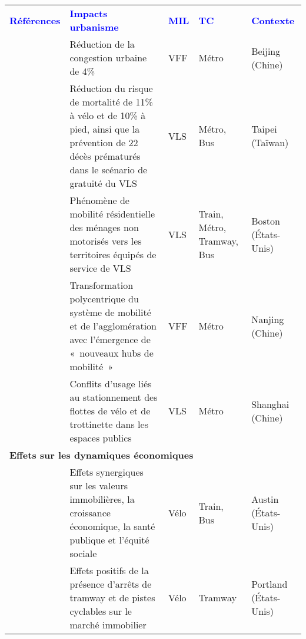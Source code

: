         \begin{longtable}{p{3cm}p{4cm}p{1.5cm}p{1.8cm}p{2.3cm}}
        \hline
        \textcolor{blue}{\textbf{Références}} & \textcolor{blue}{\textbf{Impacts urbanisme}} & \textcolor{blue}{\textbf{MIL}} & \textcolor{blue}{\textbf{TC}} & \textcolor{blue}{\textbf{Contexte}}
        \hline
        \endhead
\multicolumn{5}{l}{\textbf{Effets sur les territoires}}\\
    \small{\textcite{fan_dockless_2020}}\index{Fan, Yichun|pagebf} & \small{Réduction de la congestion urbaine de 4\%} & \small{VFF} & \small{Métro} & \small{Beijing (Chine)}\\
    \small{\textcite{lu_improving_2018}}\index{Lu, Miaojia|pagebf} & \small{Réduction du risque de mortalité de 11\% à vélo et de 10\% à pied, ainsi que la prévention de 22 décès prématurés dans le scénario de gratuité du VLS} & \small{VLS} & \small{Métro, Bus} & \small{Taipei (Taïwan)}\\
    \small{\textcite{basu_planning_2021}}\index{Basu, Rounaq|pagebf} & \small{Phénomène de mobilité résidentielle des ménages non motorisés vers les territoires équipés de service de VLS} & \small{VLS} & \small{Train, Métro, Tramway, Bus} & \small{Boston (États-Unis)}\\
    \small{\textcite{yang_spatiotemporal_2019}}\index{Yang, Yuanxuan|pagebf} & \small{Transformation polycentrique du système de mobilité et de l'agglomération avec l'émergence de «~nouveaux hubs de mobilité~»} & \small{VFF} & \small{Métro} & \small{Nanjing (Chine)}\\
    \small{\textcite{yu_policy_2021}}\index{Yu, Qing|pagebf} & \small{Conflits d'usage liés au stationnement des flottes de vélo et de trottinette dans les espaces publics} & \small{VLS} & \small{Métro} & \small{Shanghai (Chine)}\\
    \hline
\multicolumn{5}{l}{\textbf{Effets sur les dynamiques économiques}}\\
    \small{\textcite{li_exploring_2017}}\index{Li, Wenxiang|pagebf} & \small{Effets synergiques sur les valeurs immobilières, la croissance économique, la santé publique et l'équité sociale} & \small{Vélo} & \small{Train, Bus} & \small{Austin (États-Unis)}\\
    \small{\textcite{welch_long-term_2016}}\index{Welch, Timothy F.|pagebf} & \small{Effets positifs de la présence d'arrêts de tramway et de pistes cyclables sur le marché immobilier} & \small{Vélo} & \small{Tramway} & \small{Portland (États-Unis)}\\

\end{longtable}
